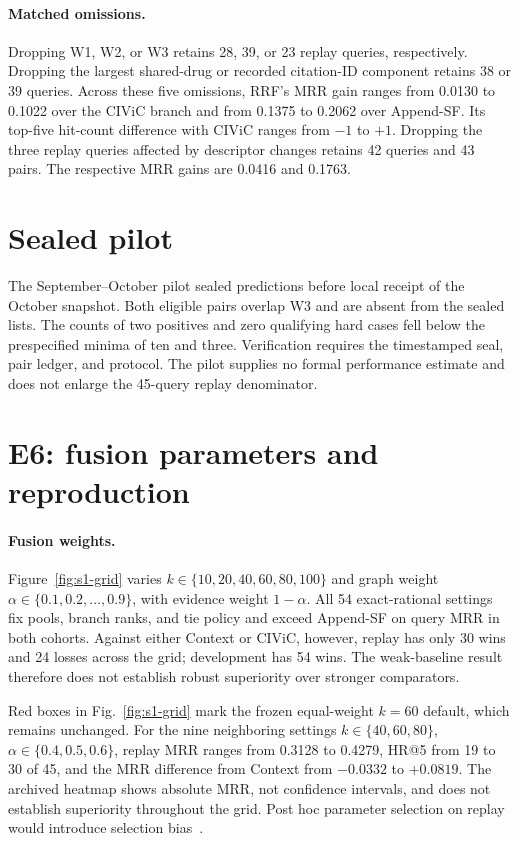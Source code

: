 \documentclass[runningheads]{llncs}
\begin{document}
\paragraph{Matched omissions.}
Dropping W1, W2, or W3 retains 28, 39, or 23 replay queries, respectively. Dropping the largest shared-drug or recorded citation-ID component retains 38 or 39 queries. Across these five omissions, RRF's MRR gain ranges from 0.0130 to 0.1022 over the CIViC branch and from 0.1375 to 0.2062 over Append-SF. Its top-five hit-count difference with CIViC ranges from $-1$ to $+1$. Dropping the three replay queries affected by descriptor changes retains 42 queries and 43 pairs. The respective MRR gains are 0.0416 and 0.1763.

\section{Sealed pilot}
The September--October pilot sealed predictions before local receipt of the October snapshot. Both eligible pairs overlap W3 and are absent from the sealed lists. The counts of two positives and zero qualifying hard cases fell below the prespecified minima of ten and three. Verification requires the timestamped seal, pair ledger, and protocol. The pilot supplies no formal performance estimate and does not enlarge the 45-query replay denominator.

\section{E6: fusion parameters and reproduction}
\paragraph{Fusion weights.}
Figure~\ref{fig:s1-grid} varies \(k\in\{10,20,40,60,80,100\}\) and graph weight \(\alpha\in\{0.1,0.2,\ldots,0.9\}\), with evidence weight \(1-\alpha\). All 54 exact-rational settings fix pools, branch ranks, and tie policy and exceed Append-SF on query MRR in both cohorts. Against either Context or CIViC, however, replay has only 30 wins and 24 losses across the grid; development has 54 wins. The weak-baseline result therefore does not establish robust superiority over stronger comparators.

Red boxes in Fig.~\ref{fig:s1-grid} mark the frozen equal-weight \(k=60\) default, which remains unchanged. For the nine neighboring settings \(k\in\{40,60,80\}\), \(\alpha\in\{0.4,0.5,0.6\}\), replay MRR ranges from 0.3128 to 0.4279, HR@5 from 19 to 30 of 45, and the MRR difference from Context from \(-0.0332\) to \(+0.0819\). The archived heatmap shows absolute MRR, not confidence intervals, and does not establish superiority throughout the grid. Post hoc parameter selection on replay would introduce selection bias~\cite{cawley}.
\end{document}
